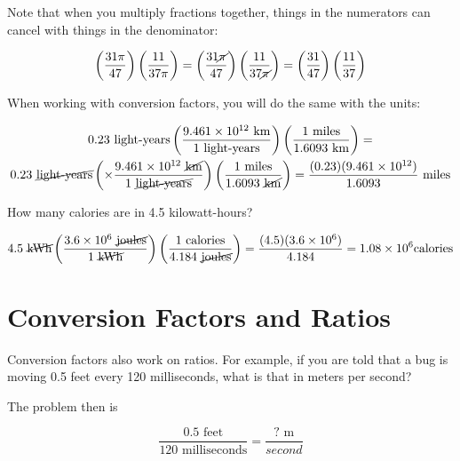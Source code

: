 Note that when you multiply fractions together, things in the numerators can cancel with things in the denominator:

$$\left( \frac{31\pi}{47} \right) \left( \frac{11}{37\pi}\right) = \left(\frac{31\cancel{\pi}}{47}\right) \left( \frac{11}{37\cancel{\pi}}\right) = \left(\frac{31}{47} \right) \left( \frac{11}{37} \right)$$

When working with conversion factors, you will do the same with the units:

\begin{multline*}
  0.23 \text{ light-years} \left( \frac{9.461 \times 10^{12} \text{ km}}{1 \text{ light-years}} \right) \left( \frac{1 \text{ miles}}{1.6093 \text{ km}} \right) = \\
  0.23 \text{ \cancel{light-years}} \left( \times \frac{9.461 \times 10^{12} \text{ \cancel{km}}}{1 \text{ \cancel{light-years}}} \right) \left( \frac{1 \text{ miles}}{1.6093 \text{ \cancel{km}}}\right) = \frac{(0.23)(9.461 \times 10^{12})}{1.6093} \text{ miles}$$
\end{multline*}

\begin{Exercise}[title={Simple Conversion Factors}, label=simple_conversion_factors]

  How many calories are in 4.5 kilowatt-hours?

\end{Exercise}
\begin{Answer}[ref=simple_conversion_factors]

  $$4.5 \text{ \cancel{kWh}} \left( \frac{3.6 \times 10^{6} \text{ \cancel{joules}}}{1 \text{ \cancel{kWh}}} \right) \left( \frac{1 \text{ calories}}{4.184 \text{ \cancel{joules}}}\right) = \frac{(4.5)(3.6 \times 10^6)}{4.184} = 1.08 \times 10^6 \text {calories}$$

\end{Answer}

\section{Conversion Factors and Ratios}

Conversion factors also work on ratios. For example, if you are told
that a bug is moving 0.5 feet every 120 milliseconds, what is that in
meters per second?

The problem then is

$$\frac{0.5 \text{ feet}}{120 \text{ milliseconds}} = \frac{\text{? m}}{second}$$

